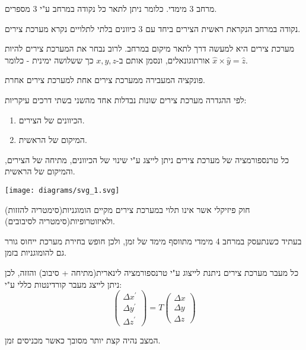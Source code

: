 \documentclass{tstextbook}
\begin{document}
\begin{definition}
מרחב 3 מימדי. כלומר ניתן לתאר כל נקודה במרחב ע"י 3 מספרים.

\end{definition}
\begin{definition}
נקודה במרחב הנקראת ראשית הצירים ביחד עם 3 כיוונים בלתי לתלויים נקרא מערכת צירים.

\end{definition}
\begin{remark}
מערכת צירים היא למעשה דרך לתאר מיקום במרחב. לרוב נבחר את המערכת צירים להיות אורתוגונאלים, ונסמן אותם ב-\(x,y,z\) כך ששלושה ימינית - כלומר \(\hat{x} \times \hat{y} = \hat{z}\).

\end{remark}
\begin{definition}
פונקציה המעבירה ממערכת צירים אחת למערכת צירים אחרת.

\end{definition}
\begin{proposition}
לפי ההגדרה מערכת צירים שונות נבדלות אחד מהשני בשתי דרכים עיקריות:

  \begin{enumerate}
    \item הכיוונים של הצירים. 


    \item המיקום של הראשית. 


  \end{enumerate}
\end{proposition}
\begin{proposition}
כל טרנספורמציה של מערכת צירים ניתן לייצג ע"י שינוי של הכיוונים, מתיחה של הצירים, והמיקום של הראשית.

\end{proposition}
\texttt{[image: diagrams/svg\_1.svg]}
\begin{corollary}
חוק פיזיקלי אשר אינו תלוי במערכת צירים מקיים הומוגניות(סימטריה להזזות) ולאיזוטרופיות(סימטריה לסיבובים). 

\end{corollary}
\begin{remark}
בעתיד כשנתעסק במרחב 4 מימדי מתווסף מימד של זמן, ולכן חופש בחירת מערכת ייחוס גורר גם להומוגניות בזמן.

\end{remark}
\begin{proposition}
כל מעבר מערכת צירים ניתנת לייצוג ע"י טרנספורמציה לינארית(מתיחה + סיבוב) והזזה, לכן ניתן לייצג מעבר קורדינטות כללי ע"י:
$$\left(\begin{array}{c}{{\Delta x^{\prime}}}\\ {{\Delta y^{\prime}}}\\ {{\Delta z^{\prime}}}\end{array}\right)=T\left(\begin{array}{c}{{\Delta x}}\\ {{\Delta y}}\\ {{\Delta z}}\end{array}\right)$$

\end{proposition}
המצב נהיה קצת יותר מסובך כאשר מכניסים זמן.
\end{document}
